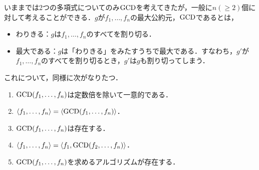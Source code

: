 \documentclass[9pt]{ltjsarticle}
\theoremstyle{break}
\theoremstyle{break}
\theoremstyle{break}
\theoremstyle{break}
\theoremstyle{break}
\theoremstyle{break}
\theoremstyle{break}
\theoremstyle{break}
\theoremstyle{break}
\theoremstyle{break}
\theoremstyle{break}
\theoremstyle{break}
\theoremstyle{break}
\theoremstyle{break}
\theoremstyle{break}
\theoremstyle{nonumberbreak}
\theoremstyle{nonumberbreak}
\begin{document}
いままでは2つの多項式についてのみ${\rm GCD}$を考えてきたが，一般に$n(\ge 2)$個に対して考えることができる．$g$が$f_1,\dots,f_n$の最大公約元，${\rm GCD}$であるとは，
\begin{itemize}
 \item わりきる：$g$は$f_1,\dots,f_n$のすべてを割り切る．
 \item 最大である：$g$は「わりきる」をみたすうちで最大である．すなわち，$g'$が$f_1,\dots,f_n$のすべてを割り切るとき，$g'$は$g$も割り切ってしまう．
\end{itemize}

これについて，同様に次がなりたつ．
\begin{enumerate}[label=(\arabic*)]
 \item ${\rm GCD}(f_1,\dots,f_n)$は定数倍を除いて一意的である．
 \item $\langle f_1,\dots,f_n \rangle=\langle {\rm GCD}(f_1,\dots,f_n) \rangle$．
 \item ${\rm GCD}(f_1,\dots,f_n)$は存在する．
 \item $\langle f_1,\dots,f_n \rangle=\langle f_1,{\rm GCD}(f_2,\dots,f_n) \rangle$．
 \item ${\rm GCD}(f_1,\dots,f_n)$を求めるアルゴリズムが存在する．
\end{enumerate}
\end{document}
